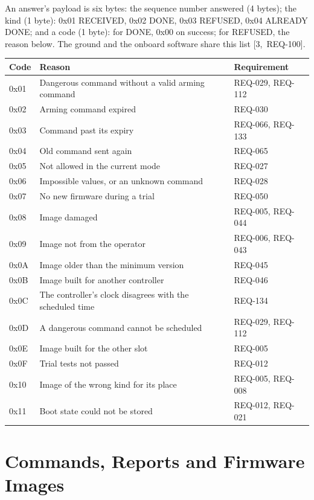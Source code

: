 \documentclass[11pt,a4paper]{article}
\begin{document}
\noindent An answer's payload is six bytes: the sequence number answered (4 bytes); the
kind (1 byte): 0x01 RECEIVED, 0x02 DONE, 0x03 REFUSED, 0x04 ALREADY DONE; and
a code (1 byte): for DONE, 0x00 on success; for REFUSED, the reason below.
The ground and the onboard software share this list [3,~REQ-100].

{\small\noindent\begin{tabularx}{\textwidth}{@{}l>{\raggedright\arraybackslash}Xl@{}}
\toprule
Code & Reason & Requirement \\
\midrule
0x01 & Dangerous command without a valid arming command & REQ-029, REQ-112 \\
0x02 & Arming command expired & REQ-030 \\
0x03 & Command past its expiry & REQ-066, REQ-133 \\
0x04 & Old command sent again & REQ-065 \\
0x05 & Not allowed in the current mode & REQ-027 \\
0x06 & Impossible values, or an unknown command & REQ-028 \\
0x07 & No new firmware during a trial & REQ-050 \\
0x08 & Image damaged & REQ-005, REQ-044 \\
0x09 & Image not from the operator & REQ-006, REQ-043 \\
0x0A & Image older than the minimum version & REQ-045 \\
0x0B & Image built for another controller & REQ-046 \\
0x0C & The controller's clock disagrees with the scheduled time & REQ-134 \\
0x0D & A dangerous command cannot be scheduled & REQ-029, REQ-112 \\
0x0E & Image built for the other slot & REQ-005 \\
0x0F & Trial tests not passed & REQ-012 \\
0x10 & Image of the wrong kind for its place & REQ-005, REQ-008 \\
0x11 & Boot state could not be stored & REQ-012, REQ-021 \\
\bottomrule
\end{tabularx}}

\section{Commands, Reports and Firmware Images}
\end{document}

